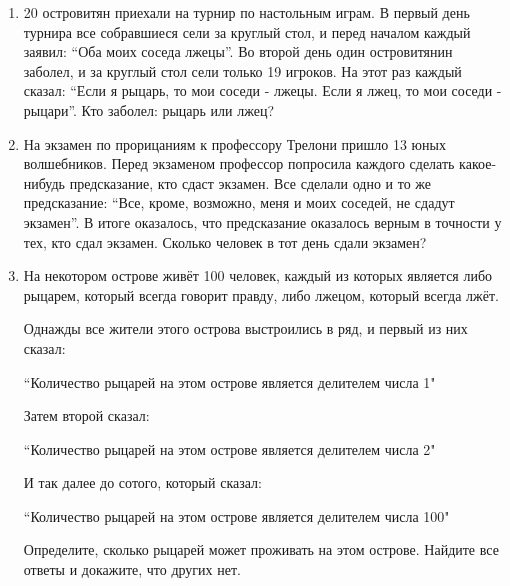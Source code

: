\documentclass[a4paper,12pt]{article}
\begin{document}
\begin{enumerate}
    \item  20   островитян приехали на турнир по настольным играм. В первый день турнира все собравшиеся сели за круглый стол, и перед началом каждый заявил: “Оба моих соседа лжецы”. Во второй день один островитянин заболел, и за круглый стол сели только 19   игроков. На этот раз каждый сказал: “Если я рыцарь, то мои соседи - лжецы. Если я лжец, то мои соседи - рыцари”. Кто заболел: рыцарь или лжец?
    \item На экзамен по прорицаниям к профессору Трелони пришло 13   юных волшебников. Перед экзаменом профессор попросила каждого сделать какое-нибудь предсказание, кто сдаст экзамен. Все сделали одно и то же предсказание: “Все, кроме, возможно, меня и моих соседей, не сдадут экзамен”. В итоге оказалось, что предсказание оказалось верным в точности у тех, кто сдал экзамен. Сколько человек в тот день сдали экзамен?
    \item На некотором острове живёт 100   человек, каждый из которых является либо рыцарем, который всегда говорит правду, либо лжецом, который всегда лжёт.

Однажды все жители этого острова выстроились в ряд, и первый из них сказал:


“Количество рыцарей на этом острове является делителем числа 1"

Затем второй сказал:


“Количество рыцарей на этом острове является делителем числа 2"

И так далее до сотого, который сказал:


“Количество рыцарей на этом острове является делителем числа 100"

Определите, сколько рыцарей может проживать на этом острове. Найдите все ответы и докажите, что других нет.
    \end{enumerate}
\end{document}
